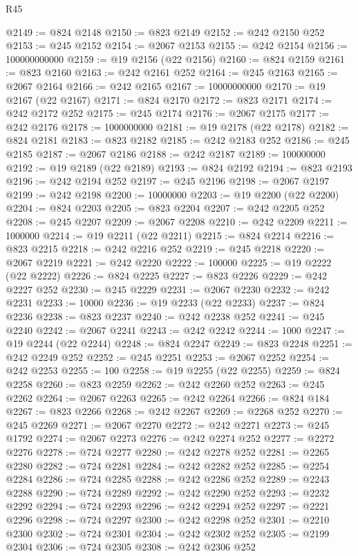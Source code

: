 \begin{lexlean}{R45}
\begin{coremodule}
{@2149 := @824 @2148
@2150 := @823 @2149
@2152 := @242 @2150 @252
@2153 := @245 @2152
@2154 := @2067 @2153
@2155 := @242 @2154
@2156 := 100000000000
@2159 := @19 @2156 (@22 @2156)
@2160 := @824 @2159
@2161 := @823 @2160
@2163 := @242 @2161 @252
@2164 := @245 @2163
@2165 := @2067 @2164
@2166 := @242 @2165
@2167 := 10000000000
@2170 := @19 @2167 (@22 @2167)
@2171 := @824 @2170
@2172 := @823 @2171
@2174 := @242 @2172 @252
@2175 := @245 @2174
@2176 := @2067 @2175
@2177 := @242 @2176
@2178 := 1000000000
@2181 := @19 @2178 (@22 @2178)
@2182 := @824 @2181
@2183 := @823 @2182
@2185 := @242 @2183 @252
@2186 := @245 @2185
@2187 := @2067 @2186
@2188 := @242 @2187
@2189 := 100000000
@2192 := @19 @2189 (@22 @2189)
@2193 := @824 @2192
@2194 := @823 @2193
@2196 := @242 @2194 @252
@2197 := @245 @2196
@2198 := @2067 @2197
@2199 := @242 @2198
@2200 := 10000000
@2203 := @19 @2200 (@22 @2200)
@2204 := @824 @2203
@2205 := @823 @2204
@2207 := @242 @2205 @252
@2208 := @245 @2207
@2209 := @2067 @2208
@2210 := @242 @2209
@2211 := 1000000
@2214 := @19 @2211 (@22 @2211)
@2215 := @824 @2214
@2216 := @823 @2215
@2218 := @242 @2216 @252
@2219 := @245 @2218
@2220 := @2067 @2219
@2221 := @242 @2220
@2222 := 100000
@2225 := @19 @2222 (@22 @2222)
@2226 := @824 @2225
@2227 := @823 @2226
@2229 := @242 @2227 @252
@2230 := @245 @2229
@2231 := @2067 @2230
@2232 := @242 @2231
@2233 := 10000
@2236 := @19 @2233 (@22 @2233)
@2237 := @824 @2236
@2238 := @823 @2237
@2240 := @242 @2238 @252
@2241 := @245 @2240
@2242 := @2067 @2241
@2243 := @242 @2242
@2244 := 1000
@2247 := @19 @2244 (@22 @2244)
@2248 := @824 @2247
@2249 := @823 @2248
@2251 := @242 @2249 @252
@2252 := @245 @2251
@2253 := @2067 @2252
@2254 := @242 @2253
@2255 := 100
@2258 := @19 @2255 (@22 @2255)
@2259 := @824 @2258
@2260 := @823 @2259
@2262 := @242 @2260 @252
@2263 := @245 @2262
@2264 := @2067 @2263
@2265 := @242 @2264
@2266 := @824 @184
@2267 := @823 @2266
@2268 := @242 @2267
@2269 := @2268 @252
@2270 := @245 @2269
@2271 := @2067 @2270
@2272 := @242 @2271
@2273 := @245 @1792
@2274 := @2067 @2273
@2276 := @242 @2274 @252
@2277 := @2272 @2276
@2278 := @724 @2277
@2280 := @242 @2278 @252
@2281 := @2265 @2280
@2282 := @724 @2281
@2284 := @242 @2282 @252
@2285 := @2254 @2284
@2286 := @724 @2285
@2288 := @242 @2286 @252
@2289 := @2243 @2288
@2290 := @724 @2289
@2292 := @242 @2290 @252
@2293 := @2232 @2292
@2294 := @724 @2293
@2296 := @242 @2294 @252
@2297 := @2221 @2296
@2298 := @724 @2297
@2300 := @242 @2298 @252
@2301 := @2210 @2300
@2302 := @724 @2301
@2304 := @242 @2302 @252
@2305 := @2199 @2304
@2306 := @724 @2305
@2308 := @242 @2306 @252
}
\end{coremodule}
\end{lexlean}
